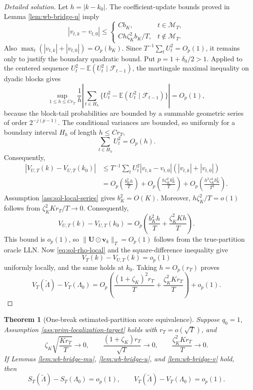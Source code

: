 \documentclass[12pt]{article}
\numberwithin{equation}{section}
\newtheorem{theorem}{Theorem}
\theoremstyle{definition}
\newcommand{\E}{\mathbb E}
\begin{document}
\begin{proof}[Detailed solution]
Let \(h=|k-k_0|\).  The coefficient-update bounds proved in Lemma
\ref{lem:wb-bridge-u} imply
\[
    |v_{t,k}-v_{t,0}|
    \leq
    \begin{cases}
      Cb_K, & t\in\mathcal M_T,\\[2mm]
      C h\zeta_K^2b_K/T, & t\notin\mathcal M_T.
    \end{cases}
\]
Also \(\max_t(|v_{t,k}|+|v_{t,0}|)=O_p(b_K)\).  Since \(T^{-1}\sum_tU_t^2=O_p(1)\), it remains only to justify the
boundary quadratic bound.  Put
\(p=1+\delta_0/2>1\).  Applied to the centered sequence
\(U_t^2-\E(U_t^2\mid\mathcal F_{t-1})\), the martingale maximal inequality on
dyadic blocks gives
\[
    \sup_{1\leq h\leq Cr_T}
    \frac{1}{h}\left|
      \sum_{t\in H_h}
       \{U_t^2-\E(U_t^2\mid\mathcal F_{t-1})\}
    \right|=O_p(1),
\]
because the block-tail probabilities are bounded by a summable geometric
series of order \(2^{-j(p-1)}\).  The conditional variances are bounded, so
uniformly for a boundary interval \(H_h\) of length \(h\leq Cr_T\),
\[
    \sum_{t\in H_h}U_t^2=O_p(h).
\]
Consequently,
\begin{align*}
    |V_{U,T}(k)-V_{U,T}(k_0)|
    &\leq T^{-1}\sum_tU_t^2
       |v_{t,k}-v_{t,0}|(|v_{t,k}|+|v_{t,0}|)\\
    &=O_p\left(\frac{b_K^2h}{T}\right)
      +O_p\left(\frac{h\zeta_K^2b_K^2}{T}\right)
      +O_p\left(\frac{h^2\zeta_K^4b_K^2}{T^2}\right).
\end{align*}
Assumption \ref{ass:sol-local-series} gives \(b_K^2=O(K)\).  Moreover,
\(h\zeta_K^2/T=o(1)\) follows from
\(\zeta_K^2Kr_T/T\to0\).  Consequently,
\[
    V_{U,T}(k)-V_{U,T}(k_0)
    =O_p\left(
       \frac{b_K^2h}{T}+
       \frac{\zeta_K^2Kh}{T}
      \right).
\]
This bound is \(o_p(1)\), so
\(\|\bm U\odot\bm v_k\|_T=O_p(1)\) follows from the true-partition oracle
LLN.  Now \eqref{eq:sol-rho-local} and the square-difference inequality give
\[
    V_T(k)-V_{U,T}(k)=o_p(1)
\]
uniformly locally, and the same holds at \(k_0\).  Taking
\(h=O_p(r_T)\) proves
\[
    V_T(\widetilde\Lambda)-V_T(\Lambda_0)
    =O_p\left(
      \frac{(1+\zeta_K)^2r_T}{T}
      +\frac{\zeta_K^2Kr_T}{T}
    \right)+o_p(1).
\]
\end{proof}


\begin{theorem}[One-break estimated-partition score equivalence]
\label{thm:wb-one-break-equivalence}
Suppose \(q_0=1\), Assumption \ref{ass:prim-localization-target} holds with \(r_T=o(\sqrt T)\), and
\[
    \zeta_K\sqrt{\frac{Kr_T}{T}}\to0,
    \qquad
    \frac{(1+\zeta_K)r_T}{\sqrt T}\to0,
    \qquad
    \frac{\zeta_K^2Kr_T}{T}\to0.
\]
If Lemmas \ref{lem:wb-bridge-mu}, \ref{lem:wb-bridge-u}, and \ref{lem:wb-bridge-v} hold, then
\[
    S_T(\widetilde\Lambda)-S_T(\Lambda_0)=o_p(1),
    \qquad
    V_T(\widetilde\Lambda)-V_T(\Lambda_0)=o_p(1).
\]
\end{theorem}
\end{document}
